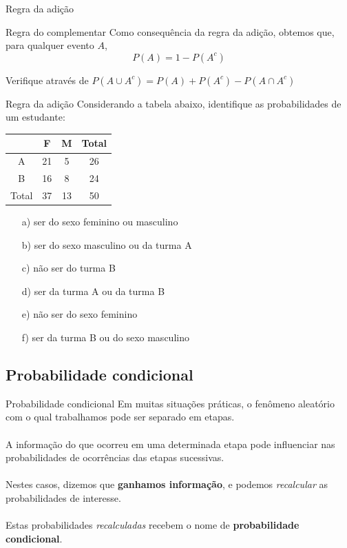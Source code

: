 \documentclass[10pt]{beamer}\usepackage[]{graphicx}\usepackage[]{color}
\theoremstyle{definition}
\begin{document}
\begin{frame}[fragile]{Regra da adição}
  \begin{block}{Regra do complementar}
    Como consequência da regra da adição, obtemos que, para qualquer
    evento $A$,
    \begin{equation*}
      P(A) = 1 - P(A^c)
    \end{equation*}
  \end{block}
  \vspace{1em}
  Verifique através de $P(A \cup A^c) = P(A) + P(A^c) - P(A \cap A^c)$
\end{frame}

\begin{frame}[fragile]{Regra da adição}
  Considerando a tabela abaixo, identifique as probabilidades de um
  estudante:
  \begin{table}
    \centering
    \begin{tabular}{c|cc|c}
      \hline
      & F & M & Total \\
      \hline
      A & 21 & 5 & 26 \\
      B & 16 & 8 & 24 \\
      \hline
      Total & 37 & 13 & 50 \\
      \hline
    \end{tabular}
  \end{table}
  \begin{itemize}
  \item[a)] ser do sexo feminino ou masculino
  \item[b)] ser do sexo masculino ou da turma A
  \item[c)] não ser do turma B
  \item[d)] ser da turma A ou da turma B
  \item[e)] não ser do sexo feminino
  \item[f)] ser da turma B ou do sexo masculino
  \end{itemize}
\end{frame}

\subsection{Probabilidade condicional}

\begin{frame}{Probabilidade condicional}
  Em muitas situações práticas, o fenômeno aleatório com o qual
  trabalhamos pode ser separado em etapas.\\~\\
  A informação do que ocorreu em uma determinada etapa pode influenciar
  nas probabilidades de ocorrências das etapas sucessivas.\\~\\
  Nestes casos, dizemos que \textbf{ganhamos informação}, e podemos
  \textsl{recalcular} as probabilidades de interesse. \\~\\
  Estas probabilidades \textsl{recalculadas} recebem o nome de
  \textbf{probabilidade condicional}.
\end{frame}
\end{document}
